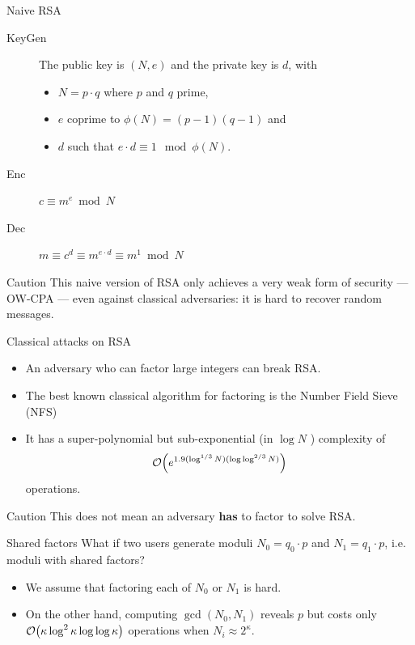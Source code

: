 \documentclass[presentation,smaller]{beamer}
\begin{document}
\begin{frame}[label={sec:orgbb1aa2e}]{Naive RSA}
\begin{description}
\item[{KeyGen}] The public key is \((N,e)\) and the private key is \(d\), with

\begin{itemize}
\item \(N = p \cdot q\) where \(p\) and \(q\) prime,
\item \(e\) coprime to \(\phi(N) = (p-1)(q-1)\) and
\item \(d\) such that \(e \cdot d \equiv 1 \mod{\phi(N)}\).
\end{itemize}

\item[{Enc}] \(c \equiv m^e \bmod{N}\)

\item[{Dec}] \(m \equiv c^d \equiv m^{e \cdot d} \equiv m^{1} \bmod{N}\)
\end{description}

\begin{block}{Caution}
This naive version of RSA only achieves a very weak form of security — OW-CPA — even against classical adversaries: it is hard to recover random messages.
\end{block}
\end{frame}

\begin{frame}[label={sec:orgd9a7b9b}]{Classical attacks on RSA}
\begin{itemize}
\item An adversary who can factor large integers can break RSA.

\item The best known classical algorithm for factoring is the Number Field Sieve (NFS)

\item It has a \alert{super-polynomial} but \alert{sub-exponential} (in \(\log N\) ) complexity of \[\bigO{e^{1.9 (\log^{1/3} N) (\log\log^{2/3}N)}}\] operations.
\end{itemize}


\pause

\begin{block}{Caution}
This does not mean an adversary \textbf{has} to factor to solve RSA.
\end{block}
\end{frame}

\begin{frame}[label={sec:org7a7fefc}]{Shared factors}
What if two users generate moduli \(N_0 = q_0 ⋅ p\) and \(N_1 = q_1 \cdot p\), i.e. moduli with shared factors?

\begin{itemize}
\item We assume that factoring each of \(N_0\) or \(N_1\) is hard.
\item On the other hand, computing \(\gcd(N_0, N_1)\) reveals \(p\) but costs only \(\bigO{\kappa \log^2 \kappa \log \log \kappa}\) operations when \(N_i \approx 2^\kappa\).
\end{itemize}
\end{frame}
\end{document}
